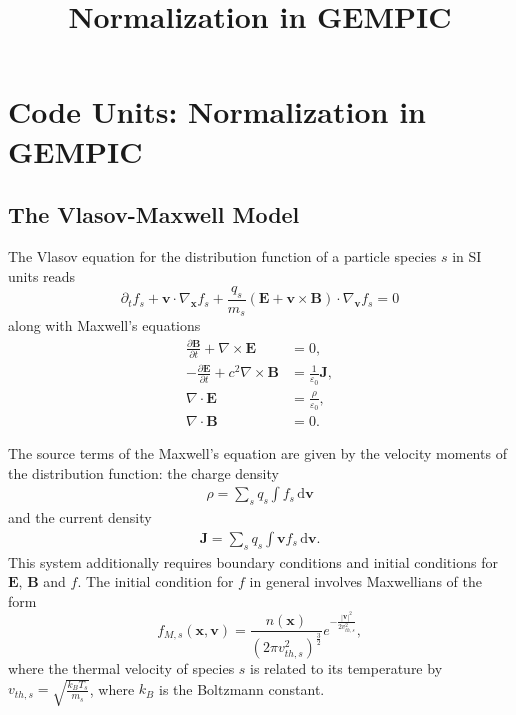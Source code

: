 \documentclass[english]{article}
\title{Normalization in GEMPIC}
\newcommand{\bx}{\textbf{x}}
\newcommand{\bv}{\textbf{v}}
\newcommand{\bB}{\textbf{B}}
\newcommand{\bE}{\textbf{E}}
\newcommand{\bJ}{\textbf{J}}
\newcommand{\du}{\,\mathrm{d}}
\begin{document}
\maketitle

\section{Code Units: Normalization in GEMPIC}

\subsection{The Vlasov-Maxwell Model}

The Vlasov equation for the distribution function of a particle species $s$ in SI units reads 
\begin{equation}\label{eq:Vlasov}
\partial_t f_s + \bv \cdot \nabla_{\bx} f_s + \frac{q_s}{m_s} \left( \bE + \bv \times \bB \right) \cdot \nabla_{\bv} f_s = 0
\end{equation}
along with Maxwell's equations
\begin{align}
\frac{\partial \bB}{\partial t} + \nabla \times \bE &= 0, \\
- \frac{\partial \bE}{\partial t} + c^2\nabla \times \bB &= \frac{1}{\varepsilon_0}\bJ, \\
\nabla \cdot \bE &= \frac{\rho}{\varepsilon_0},\\
\nabla \cdot \bB &= 0.
\end{align}

The source terms of the Maxwell's equation are given by the velocity moments of the distribution function: the charge density
\begin{align*}
\rho= \sum_s q_s \int f_s \du\bv
\end{align*}
and the current density
\begin{align*}
\bJ =\sum_s q_s\int \bv f_s \du\bv.
\end{align*}
This system additionally requires boundary conditions and initial conditions for $\mathbf{E}$, $\mathbf{B}$ and $f$.
The initial condition for $f$ in general involves Maxwellians of the form
\begin{equation}\label{eq:maxwellian}
	f_{M,s}(\mathbf{x},\mathbf{v})= \frac{n(\mathbf{x})}{(2\pi v_{th,s}^2)^{\frac 32}} e^{-\frac{|\bv|^2}{2v_{th,s}^2}},
\end{equation}
where the thermal velocity of species $s$ is related to its temperature by $v_{th,s}=\sqrt{\frac{k_B T_s}{m_s}}$, where $k_B$ is the Boltzmann constant. 
\end{document}
